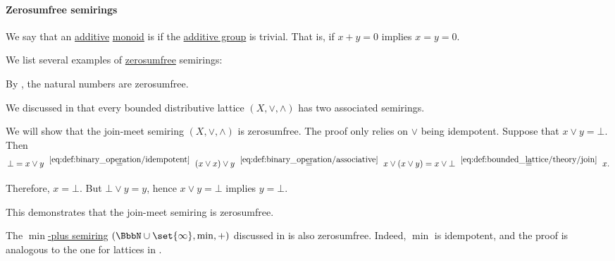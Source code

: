\paragraph{Zerosumfree semirings}

\begin{definition}\label{def:zerosumfree}
  We say that an \hyperref[con:additive_semigroup]{additive} \hyperref[def:monoid]{monoid} is  if the \hyperref[thm:invertible_submonoid_is_group]{additive group} is trivial. That is, if \( x + y = 0 \) implies \( x = y = 0 \).
\end{definition}

\begin{example}\label{ex:def:zerosumfree}
  We list several examples of \hyperref[def:zerosumfree]{zerosumfree} semirings:
  \begin{thmenum}
     By , the natural numbers are zerosumfree.

     We discussed in  that every bounded distributive lattice \( (X, \vee, \wedge) \) has two associated semirings.

    We will show that the join-meet semiring \( (X, \vee, \wedge) \) is zerosumfree. The proof only relies on \( \vee \) being idempotent. Suppose that \( x \vee y = \bot \). Then
    \begin{equation*}
      \bot
      =
      x \vee y
      \reloset {\eqref{eq:def:binary_operation/idempotent}} =
      (x \vee x) \vee y
      \reloset {\eqref{eq:def:binary_operation/associative}} =
      x \vee (x \vee y)
      =
      x \vee \bot
      \reloset {\eqref{eq:def:bounded_lattice/theory/join}} =
      x.
    \end{equation*}

    Therefore, \( x = \bot \). But \( \bot \vee y = y \), hence \( x \vee y = \bot \) implies \( y = \bot \).

    This demonstrates that the join-meet semiring is zerosumfree.

     The \hyperref[def:tropical_semiring]{\( \min \)-plus semiring} \( (\BbbN \cup \set{ \infty }, \min, +) \) discussed in  is also zerosumfree. Indeed, \( \min \) is idempotent, and the proof is analogous to the one for lattices in .
  \end{thmenum}
\end{example}
